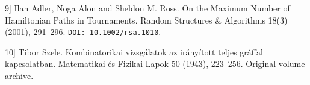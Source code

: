 \documentclass[11pt,a4paper]{article}
\begin{document}
\hypertarget{bib-9}{}\label{bib-9}\noindent {[}9{]} Ilan Adler, Noga Alon and Sheldon M. Ross. On the Maximum Number of Hamiltonian Paths in Tournaments. Random Structures \& Algorithms 18(3) (2001), 291--296. \href{https://doi.org/10.1002/rsa.1010}{\nolinkurl{DOI: 10.1002/rsa.1010}}.

\hypertarget{bib-10}{}\label{bib-10}\noindent {[}10{]} Tibor Szele. Kombinatorikai vizsgálatok az irányított teljes gráffal kapcsolatban. Matematikai és Fizikai Lapok 50 (1943), 223--256. \href{https://real-j.mtak.hu/7300/}{Original volume archive}.
\end{document}
